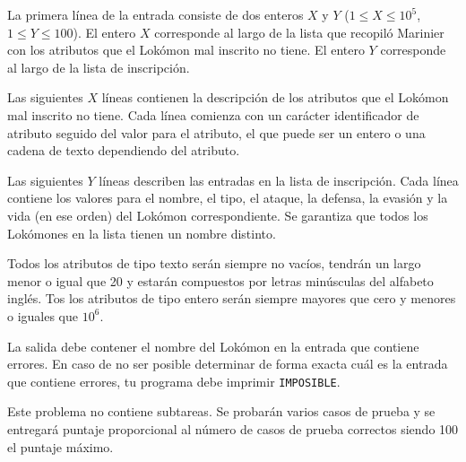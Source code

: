 \documentclass{oci}
\begin{document}
\begin{inputDescription}
La primera línea de la entrada consiste de dos enteros $X$ y $Y$
($1 \leq X \leq 10^5$, $1 \leq Y \leq 100$).
El entero $X$ corresponde al largo de la lista que recopiló Marinier con los atributos
que el Lokómon mal inscrito no tiene.
El entero $Y$ corresponde al largo de la lista de inscripción.

Las siguientes $X$ líneas contienen la descripción de los atributos que el Lokómon mal
inscrito no tiene.
Cada línea comienza con un carácter identificador de atributo seguido del valor para el atributo,
el que puede ser un entero o una cadena de texto dependiendo del atributo.

Las siguientes $Y$ líneas describen las entradas en la lista de inscripción.
Cada línea contiene los valores para el nombre, el tipo, el ataque, la defensa,
la evasión y la vida (en ese orden) del Lokómon correspondiente.
Se garantiza que todos los Lokómones en la lista tienen un nombre distinto.

Todos los atributos de tipo texto serán siempre no vacíos, tendrán un largo menor o igual que 20
y estarán compuestos por letras minúsculas del alfabeto inglés.
Tos los atributos de tipo entero serán siempre mayores que cero y menores o iguales
que $10^6$.
\end{inputDescription}

\begin{outputDescription}
La salida debe contener el nombre del Lokómon en la entrada que contiene errores.
En caso de no ser posible determinar de forma exacta cuál es la entrada que contiene errores,
tu programa debe imprimir \texttt{IMPOSIBLE}.
\end{outputDescription}

\begin{scoreDescription}
Este problema no contiene subtareas.
Se probarán varios casos de prueba y se entregará puntaje proporcional al número
de casos de prueba correctos siendo 100 el puntaje máximo.
\end{scoreDescription}

\begin{sampleDescription}
\end{sampleDescription}
\end{document}

